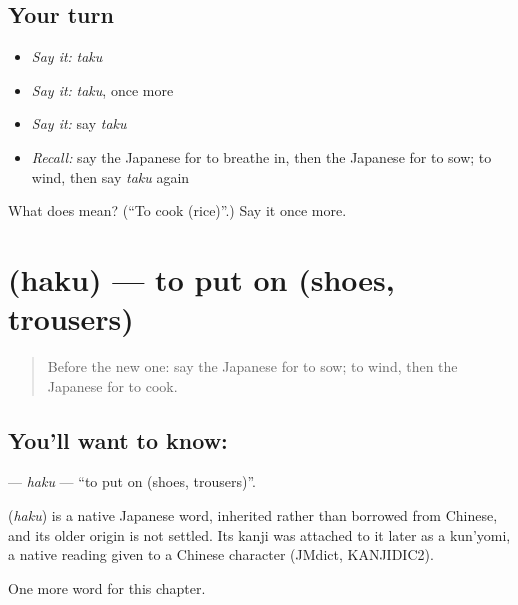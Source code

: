 \subsection*{Your turn}
\begin{itemize}
\raggedright
  \item \emph{Say it:} \emph{taku}
  \item \emph{Say it:} \emph{taku}, once more
  \item \emph{Say it:} say \emph{taku}
  \item \emph{Recall:} say the Japanese for to breathe in, then the Japanese for to sow; to wind, then say \emph{taku} again
\end{itemize}

\begin{tcolorbox}[breakable,colback=teal!4,colframe=teal!35!black,title={Before you move on}]
What does  mean? (\textquotedblleft{}To cook (rice)\textquotedblright{}.) Say it once more.
\end{tcolorbox}
\section[\texorpdfstring{\ja{はく} (haku)}{はく (haku)}]{ (haku) — to put on (shoes, trousers)}

\label{lesson:JA-C85-haku}



\begin{quote}
Before the new one: say the Japanese for to sow; to wind, then the Japanese for to cook.
\end{quote}

\subsection*{You'll want to know: }
\textbf{} — \emph{haku} — \textquotedblleft{}to put on (shoes, trousers)\textquotedblright{}.

\begin{cousinweb}
\textbf{} (\emph{haku}) is a native Japanese word, inherited rather than borrowed from Chinese, and its older origin is not settled. Its kanji was attached to it later as a kun'yomi, a native reading given to a Chinese character (JMdict, KANJIDIC2).
\end{cousinweb}

\begin{grammarlens}[title={What you've built}]
One more word for this chapter.
\end{grammarlens}

